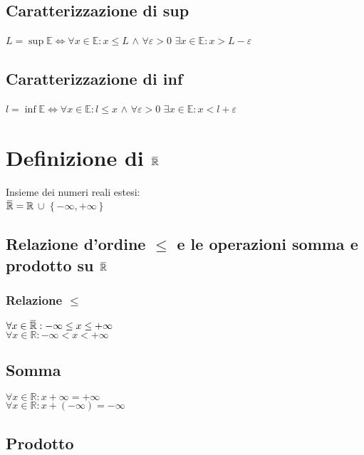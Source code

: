 \documentclass[a4paper, twoside, italian, 11pt]{book}
\newcommand{\braces}[1] {\left \{ #1 \right \}}
\newcommand{\overbar}[1] {\mkern 1.5mu\overline{\mkern-1.5mu#1\mkern-1.5mu}\mkern 1.5mu}
\newcommand{\R}{\mathbb{R}}
\newcommand{\E}{\mathbb{E}}
\begin{document}
\subsection{Caratterizzazione di sup}

\noindent
$L = \sup \E \iff \forall x \in \E : x \leq L$ $\land$ $\forall \varepsilon > 0$ $\exists x \in \E : x > L - \varepsilon$


\subsection{Caratterizzazione di inf}

\noindent
$l = \inf \E \iff \forall x \in \E : l \leq x$ $\land$ $\forall \varepsilon > 0$ $\exists x \in \E : x < l + \varepsilon$



\section{Definizione di $\overbar\R$}

\noindent
Insieme dei numeri reali estesi: \\
$\overbar\R = \R$ $\cup$ $\braces{-\infty, +\infty}$


\subsection {Relazione d'ordine $\leq$ e le operazioni somma e prodotto su $\overbar\R$}


\subsubsection{Relazione $\leq$}

\noindent
$\forall x \in \overbar\R: -\infty \leq x \leq +\infty$ \\
$\forall x \in \R: -\infty < x < +\infty$


\subsection{Somma}

\noindent
$\forall x \in \R: x + \infty = +\infty$ \\
$\forall x \in \R: x + (-\infty) = -\infty$


\subsection{Prodotto}
\end{document}
